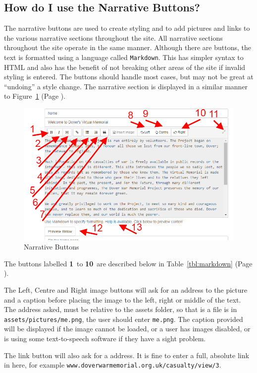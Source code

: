 \documentclass[12pt]{article}
\newcommand{\marker}[1]{\color{red}\textbf{#1}\color{black}}
\newcommand{\myref}[1]{\ref{#1} {\scriptsize(Page \pageref{#1})}}
\begin{document}
\newpage
\FloatBarrier
\subsection{How do I use the Narrative Buttons?}\label{ssec:narrative}
The narrative buttons are used to create styling and to add pictures and links to the various narrative sections throughout the site. All narrative sections throughout the site operate in the same manner. Although there are buttons, the text is formatted using a language called \texttt{Markdown}. This has simpler syntax to HTML and also has the benefit of not breaking other areas of the site if invalid styling is entered. The buttons should handle most cases, but may not be great at ``undoing'' a style change. The narrative section is displayed in a similar manner to Figure~\myref{fig:markdown}.

\begin{figure}[h]
  \centering
 \includegraphics[width=.9\textwidth]{pics/markdown.png}
	\caption{Narrative Buttons}\label{fig:markdown}
\end{figure}

The buttons labelled \marker{1}\ to \marker{10}\ are described below in Table~\myref{tbl:markdown}.

The Left, Centre and Right image buttons will ask for an address to the picture and a caption before placing the image to the left, right or middle of the text. The address asked, must be relative to the assets folder, so that is a file is in \texttt{assets/pictures/me.png}, the user should enter \texttt{me.png}. The caption provided will be displayed if the image cannot be loaded, or a user has images disabled, or is using some text-to-speech software if they have a sight problem.

The link button will also ask for a address. It is fine to enter a full, absolute link in here, for example \texttt{www.doverwarmemorial.org.uk/casualty/view/3}.
\end{document}
